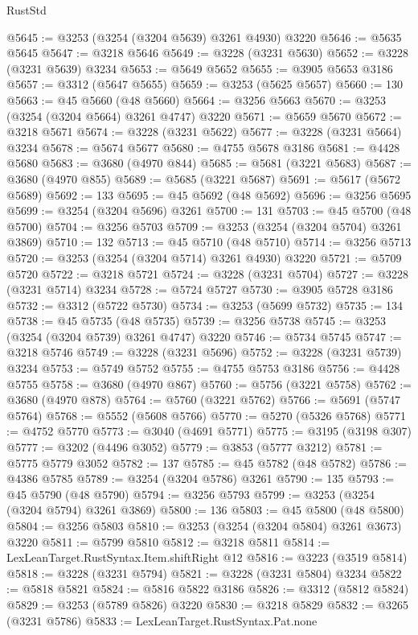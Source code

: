 \begin{lexlean}{RustStd}
\begin{coremodule}
@5645 := @3253 (@3254 (@3204 @5639) @3261 @4930) @3220
@5646 := @5635 @5645
@5647 := @3218 @5646
@5649 := @3228 (@3231 @5630)
@5652 := @3228 (@3231 @5639) @3234
@5653 := @5649 @5652
@5655 := @3905 @5653 @3186
@5657 := @3312 (@5647 @5655)
@5659 := @3253 (@5625 @5657)
@5660 := 130
@5663 := @45 @5660 (@48 @5660)
@5664 := @3256 @5663
@5670 := @3253 (@3254 (@3204 @5664) @3261 @4747) @3220
@5671 := @5659 @5670
@5672 := @3218 @5671
@5674 := @3228 (@3231 @5622)
@5677 := @3228 (@3231 @5664) @3234
@5678 := @5674 @5677
@5680 := @4755 @5678 @3186
@5681 := @4428 @5680
@5683 := @3680 (@4970 @844)
@5685 := @5681 (@3221 @5683)
@5687 := @3680 (@4970 @855)
@5689 := @5685 (@3221 @5687)
@5691 := @5617 (@5672 @5689)
@5692 := 133
@5695 := @45 @5692 (@48 @5692)
@5696 := @3256 @5695
@5699 := @3254 (@3204 @5696) @3261
@5700 := 131
@5703 := @45 @5700 (@48 @5700)
@5704 := @3256 @5703
@5709 := @3253 (@3254 (@3204 @5704) @3261 @3869)
@5710 := 132
@5713 := @45 @5710 (@48 @5710)
@5714 := @3256 @5713
@5720 := @3253 (@3254 (@3204 @5714) @3261 @4930) @3220
@5721 := @5709 @5720
@5722 := @3218 @5721
@5724 := @3228 (@3231 @5704)
@5727 := @3228 (@3231 @5714) @3234
@5728 := @5724 @5727
@5730 := @3905 @5728 @3186
@5732 := @3312 (@5722 @5730)
@5734 := @3253 (@5699 @5732)
@5735 := 134
@5738 := @45 @5735 (@48 @5735)
@5739 := @3256 @5738
@5745 := @3253 (@3254 (@3204 @5739) @3261 @4747) @3220
@5746 := @5734 @5745
@5747 := @3218 @5746
@5749 := @3228 (@3231 @5696)
@5752 := @3228 (@3231 @5739) @3234
@5753 := @5749 @5752
@5755 := @4755 @5753 @3186
@5756 := @4428 @5755
@5758 := @3680 (@4970 @867)
@5760 := @5756 (@3221 @5758)
@5762 := @3680 (@4970 @878)
@5764 := @5760 (@3221 @5762)
@5766 := @5691 (@5747 @5764)
@5768 := @5552 (@5608 @5766)
@5770 := @5270 (@5326 @5768)
@5771 := @4752 @5770
@5773 := @3040 (@4691 @5771)
@5775 := @3195 (@3198 @307)
@5777 := @3202 (@4496 @3052)
@5779 := @3853 (@5777 @3212)
@5781 := @5775 @5779 @3052
@5782 := 137
@5785 := @45 @5782 (@48 @5782)
@5786 := @4386 @5785
@5789 := @3254 (@3204 @5786) @3261
@5790 := 135
@5793 := @45 @5790 (@48 @5790)
@5794 := @3256 @5793
@5799 := @3253 (@3254 (@3204 @5794) @3261 @3869)
@5800 := 136
@5803 := @45 @5800 (@48 @5800)
@5804 := @3256 @5803
@5810 := @3253 (@3254 (@3204 @5804) @3261 @3673) @3220
@5811 := @5799 @5810
@5812 := @3218 @5811
@5814 := LexLeanTarget.RustSyntax.Item.shiftRight @12
@5816 := @3223 (@3519 @5814)
@5818 := @3228 (@3231 @5794)
@5821 := @3228 (@3231 @5804) @3234
@5822 := @5818 @5821
@5824 := @5816 @5822 @3186
@5826 := @3312 (@5812 @5824)
@5829 := @3253 (@5789 @5826) @3220
@5830 := @3218 @5829
@5832 := @3265 (@3231 @5786)
@5833 := LexLeanTarget.RustSyntax.Pat.none

\end{coremodule}
\end{lexlean}
